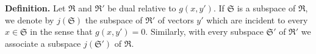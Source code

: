 \textbf{Definition.} Let $\mathfrak{R}$ and $\mathfrak{R}'$ be dual relative to $g(x, y')$. If $\mathfrak{S}$ is a subspace of $\mathfrak{R}$, we denote by $j(\mathfrak{S})$ the subspace of $\mathfrak{R}'$ of vectors $y'$ which are incident to every $x \in \mathfrak{S}$ in the sense that $g(x, y') = 0$. Similarly, with every subspace $\mathfrak{S}'$ of $\mathfrak{R}'$ we associate a subspace $j(\mathfrak{S}')$ of $\mathfrak{R}$.
